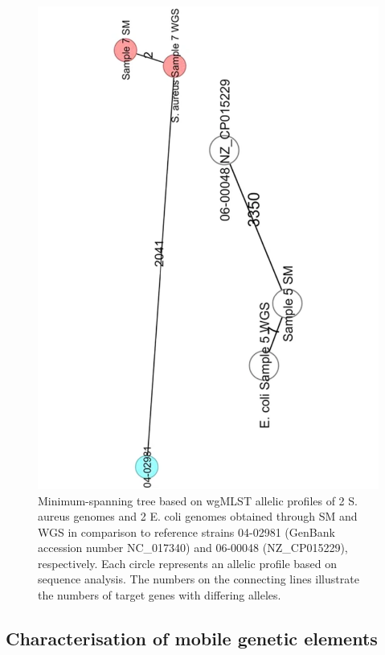 \begin{figure}[h!]
\centering
\includegraphics[angle=-90,width=\textwidth]{figures/chapter 2/41598_2018_31873_Fig2_HTML.pdf}
\caption{Minimum-spanning tree based on wgMLST allelic profiles of 2 S. aureus genomes and 2 E. coli genomes obtained through SM and \ac{WGS} in comparison to reference strains 04-02981 (GenBank accession number NC\_017340) and 06-00048 (NZ\_CP015229), respectively. Each circle represents an allelic profile based on sequence analysis. The numbers on the connecting lines illustrate the numbers of target genes with differing alleles.}
\label{fig:chap2_figure2}
\end{figure}

\subsection{Characterisation of mobile genetic elements}

